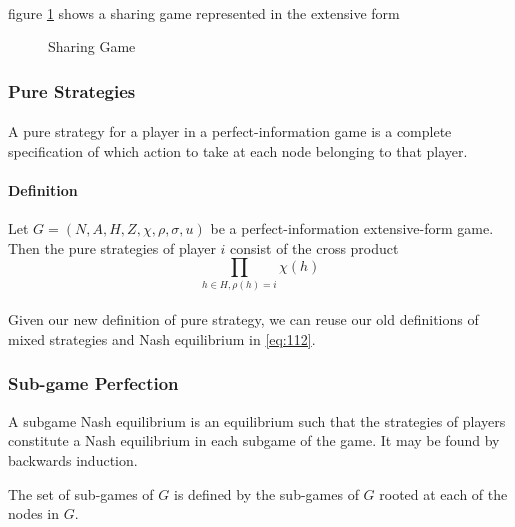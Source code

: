 \paragraph{}figure \ref{fig:scaled_diss} shows a sharing game represented in the extensive form
\begin{figure}[h]
 
  \centering
  \caption{Sharing Game\label{fig:scaled_diss}}
\end{figure}
\subsubsection{Pure Strategies}
\paragraph{} A pure strategy for a player in a perfect-information game is a complete specification of which action to take at each node belonging to that player.
\paragraph{Definition} Let $G = (N, A, H, Z,\chi ,\rho, \sigma, u ) $ be a perfect-information extensive-form game. Then the pure strategies of player $i$ consist of the cross product\\
\begin{equation}
\prod_{h \in H, \rho(h)=i}\chi(h)
\end{equation}

\paragraph{}
Given our new definition of pure strategy, we can reuse our old definitions of mixed strategies and Nash equilibrium in \ref{eq:112}.

\subsubsection{Sub-game Perfection}
A subgame Nash equilibrium is an equilibrium such that the strategies of players constitute a Nash equilibrium in each subgame of the game. It may be found by backwards induction.
\begin{mydef}\label{def:def555}
The set of sub-games of $G$ is defined by the sub-games of $G$ rooted at each of the nodes in $G$.
\end{mydef}
